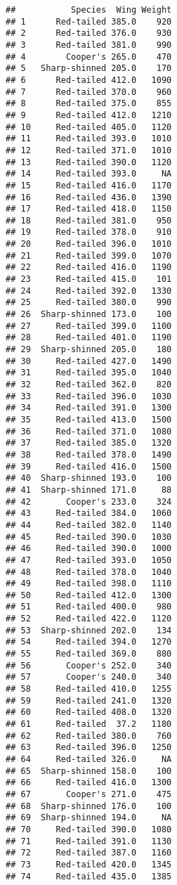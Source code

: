 \documentclass[
]{article}
\begin{document}
\begin{verbatim}
##           Species  Wing Weight
## 1      Red-tailed 385.0    920
## 2      Red-tailed 376.0    930
## 3      Red-tailed 381.0    990
## 4        Cooper's 265.0    470
## 5   Sharp-shinned 205.0    170
## 6      Red-tailed 412.0   1090
## 7      Red-tailed 370.0    960
## 8      Red-tailed 375.0    855
## 9      Red-tailed 412.0   1210
## 10     Red-tailed 405.0   1120
## 11     Red-tailed 393.0   1010
## 12     Red-tailed 371.0   1010
## 13     Red-tailed 390.0   1120
## 14     Red-tailed 393.0     NA
## 15     Red-tailed 416.0   1170
## 16     Red-tailed 436.0   1390
## 17     Red-tailed 418.0   1150
## 18     Red-tailed 381.0    950
## 19     Red-tailed 378.0    910
## 20     Red-tailed 396.0   1010
## 21     Red-tailed 399.0   1070
## 22     Red-tailed 416.0   1190
## 23     Red-tailed 415.0    101
## 24     Red-tailed 392.0   1330
## 25     Red-tailed 380.0    990
## 26  Sharp-shinned 173.0    100
## 27     Red-tailed 399.0   1100
## 28     Red-tailed 401.0   1190
## 29  Sharp-shinned 205.0    180
## 30     Red-tailed 427.0   1490
## 31     Red-tailed 395.0   1040
## 32     Red-tailed 362.0    820
## 33     Red-tailed 396.0   1030
## 34     Red-tailed 391.0   1300
## 35     Red-tailed 413.0   1500
## 36     Red-tailed 371.0   1080
## 37     Red-tailed 385.0   1320
## 38     Red-tailed 378.0   1490
## 39     Red-tailed 416.0   1500
## 40  Sharp-shinned 193.0    100
## 41  Sharp-shinned 171.0     88
## 42       Cooper's 233.0    324
## 43     Red-tailed 384.0   1060
## 44     Red-tailed 382.0   1140
## 45     Red-tailed 390.0   1030
## 46     Red-tailed 390.0   1000
## 47     Red-tailed 393.0   1050
## 48     Red-tailed 378.0   1040
## 49     Red-tailed 398.0   1110
## 50     Red-tailed 412.0   1300
## 51     Red-tailed 400.0    980
## 52     Red-tailed 422.0   1120
## 53  Sharp-shinned 202.0    134
## 54     Red-tailed 394.0   1270
## 55     Red-tailed 369.0    880
## 56       Cooper's 252.0    340
## 57       Cooper's 240.0    340
## 58     Red-tailed 410.0   1255
## 59     Red-tailed 241.0   1320
## 60     Red-tailed 408.0   1320
## 61     Red-tailed  37.2   1180
## 62     Red-tailed 380.0    760
## 63     Red-tailed 396.0   1250
## 64     Red-tailed 326.0     NA
## 65  Sharp-shinned 158.0    100
## 66     Red-tailed 416.0   1300
## 67       Cooper's 271.0    475
## 68  Sharp-shinned 176.0    100
## 69  Sharp-shinned 194.0     NA
## 70     Red-tailed 390.0   1080
## 71     Red-tailed 391.0   1130
## 72     Red-tailed 387.0   1160
## 73     Red-tailed 420.0   1345
## 74     Red-tailed 435.0   1385

\end{verbatim}
\end{document}
